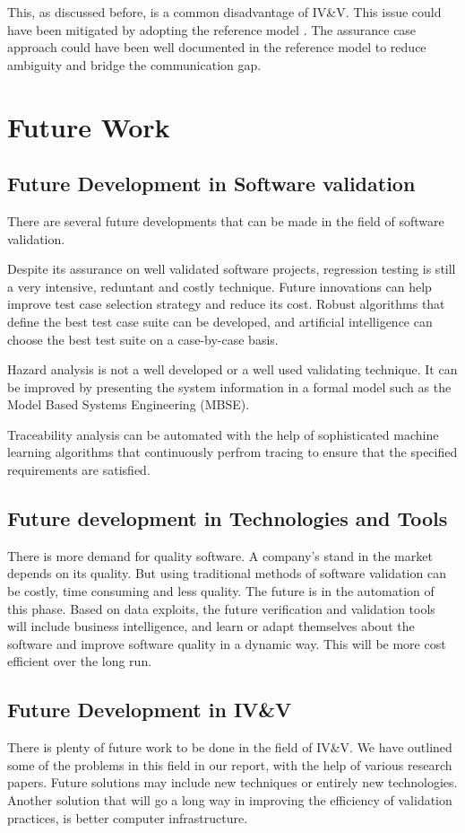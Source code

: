 \documentclass[journal, onecolumn]{IEEEtran}
\begin{document}
	This, as discussed before, is a common disadvantage of IV\&V. This issue could have been mitigated by adopting the reference model \cite{refmod}. The assurance case approach could have been well documented in the reference model to reduce ambiguity and bridge the communication gap.
	
	
	\bigskip
	\section{Future Work}
	\bigskip
	\subsection{Future Development in Software validation}
	\bigskip
	There are several future developments that can be made in the field of software validation. 
	
	Despite its assurance on well validated software projects, regression testing is still a very intensive, reduntant and costly technique. Future innovations can help improve test case selection strategy and reduce its cost. Robust algorithms that define the best test case suite can be developed, and artificial intelligence can choose the best test suite on a case-by-case basis. 
	
	Hazard analysis is not a well developed or a well used validating technique. It can be improved by presenting the system information in a formal model such as the Model Based Systems Engineering (MBSE).
	
	Traceability analysis can be automated with the help of sophisticated machine learning algorithms that continuously perfrom tracing to ensure that the specified requirements are satisfied.
	
	\subsection{Future development in Technologies and Tools}
	\bigskip
	There is more demand for quality software. A company's stand in the market depends on its quality. But using traditional methods of software validation can be costly, time consuming and less quality. The future is in the automation of this phase. Based on data exploits, the future verification and validation tools will include business intelligence, and learn or adapt themselves about the software and improve software quality in a dynamic way. This will be more cost efficient over the long run. 
	
	\subsection{Future Development in IV\&V}
	\bigskip
	There is plenty of future work to be done in the field of IV\&V. We have outlined some of the problems in this field in our report, with the help of various research papers. Future solutions may include new techniques or entirely new technologies. Another solution that will go a long way in improving the efficiency of validation practices, is better computer infrastructure. 
	
\end{document}
